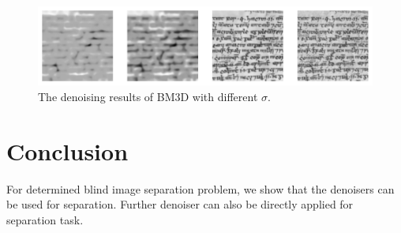 \documentclass[conference]{IEEEtran}
\theoremstyle{plain}
\begin{document}
 \begin{figure}[ht!]
	\centering
	\includegraphics[width=\linewidth]{./fig/test_bm3d.pdf}
	\caption{The denoising results of BM3D with different $\sigma$.}
	\label{fig: bm3d denoiser}
\end{figure}

\section{Conclusion}
\label{sec: conclusion}
For determined blind image separation problem, we show that the denoisers can be used for separation. Further denoiser can also be directly applied for separation task.




\end{document}
